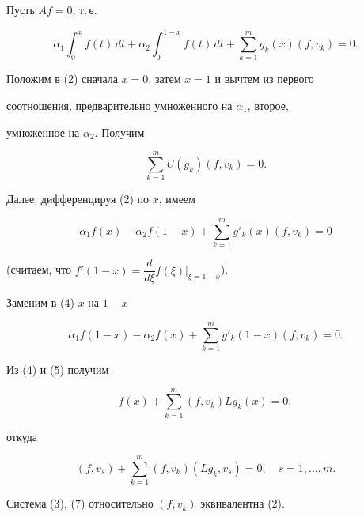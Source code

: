 \begin{pf}


Пусть $Af=0$, т.\,е.


\begin{equation}


\alpha_1\int^x_0f(t)\,dt +\alpha_2\int^{1-x}_0f(t)\,dt+


\sum\limits^m_{k=1}g_k(x)(f,v_k)=0.


\end{equation}


Положим в (2) сначала $x=0$, затем $x=1$ и вычтем из первого


соотношения, предварительно умноженного на $\alpha_1$, второе,


умноженное на $\alpha_2$. Получим


\begin{equation}


\sum\limits^m_{k=1}U(g_k)(f,v_k)=0.


\end{equation}


Далее, дифференцируя (2) по $x$, имеем


\begin{equation}


\alpha_1f(x)-\alpha_2f(1-x)+\sum\limits^m_{k=1}g'_k(x)(f,v_k)=0


\end{equation}


(считаем, что $f'(1-x)=\dfrac{d}{d\xi}f(\xi)|_{\xi=1-x}$).


Заменим в (4) $x$ на $1-x$


\begin{equation}


\alpha_1f(1-x)-\alpha_2f(x)+\sum\limits^m_{k=1}g'_k(1-x)(f,v_k)=0.


\end{equation}


Из (4) и (5) получим


\begin{equation}


f(x)+\sum\limits_{k=1}^m (f,v_k)Lg_k(x)=0,


\end{equation}


откуда


\begin{equation}


(f,v_s)+\sum\limits_{k=1}^m (f,v_k)(Lg_k,v_s)=0,\quad


s=1,\dotsc,m.


\end{equation}


Система (3), (7) относительно $(f,v_k)$ эквивалентна (2).


\end{pf}





